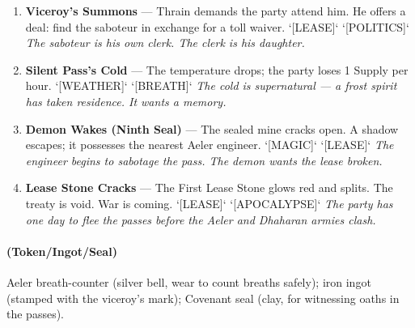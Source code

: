 \begin{enumerate}
\item[J] \textbf{Viceroy's Summons} --- Thrain demands the party attend him. He offers a deal: find the saboteur in exchange for a toll waiver. `[LEASE]` `[POLITICS]`
  \hfill \textit{The saboteur is his own clerk. The clerk is his daughter.}
\item[Q] \textbf{Silent Pass's Cold} --- The temperature drops; the party loses 1 Supply per hour. `[WEATHER]` `[BREATH]`
  \hfill \textit{The cold is supernatural — a frost spirit has taken residence. It wants a memory.}
\item[K] \textbf{Demon Wakes (Ninth Seal)} --- The sealed mine cracks open. A shadow escapes; it possesses the nearest Aeler engineer. `[MAGIC]` `[LEASE]`
  \hfill \textit{The engineer begins to sabotage the pass. The demon wants the lease broken.}
\item[A] \textbf{Lease Stone Cracks} --- The First Lease Stone glows red and splits. The treaty is void. War is coming. `[LEASE]` `[APOCALYPSE]`
  \hfill \textit{The party has one day to flee the passes before the Aeler and Dhaharan armies clash.}
\end{enumerate}

\paragraph*{(Token/Ingot/Seal)} Aeler breath-counter (silver bell, wear to count breaths safely); iron ingot (stamped with the viceroy's mark); Covenant seal (clay, for witnessing oaths in the passes).

